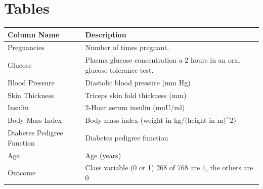 \documentclass[12pt]{article}
\begin{document}
\section{Tables}
{
\clearpage
\thispagestyle{empty}
\begin{landscape}
\centering
\begin{table}[]
\centering
\begin{tabular}{|l|l|}
\hline
Column Name                & Description                                                               \\ \hline
Pregnancies                & Number of times pregnant.                                                 \\ \hline
Glucose                    & Plasma glucose concentration a 2 hours in an oral glucose tolerance test. \\ \hline
Blood Pressure             & Diastolic blood pressure (mm Hg)                                          \\ \hline
Skin Thickness             & Triceps skin fold thickness (mm)                                          \\ \hline
Insulin                    & 2-Hour serum insulin (muU/ml)                                            \\ \hline
Body Mass Index            & Body mass index (weight in kg/(height in m)\textasciicircum{}2)           \\ \hline
Diabetes Pedigree Function & Diabetes pedigree function                                                \\ \hline
Age                        & Age (years)                                                               \\ \hline
Outcome                    & Class variable (0 or 1) 268 of 768 are 1, the others are 0                \\ \hline
\end{tabular}
\end{table}
\label{table:1}
\end{landscape}
\clearpage
}
\end{document}
